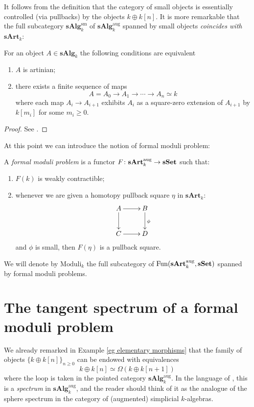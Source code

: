 \begin{refsection}
It follows from the definition that the category of small objects is essentially controlled (via pullbacks) by the objects $k \oplus k[n]$. It is more remarkable that the full subcategory $\mathbf{sAlg}_k^{\mathrm{sm}}$ of $\mathbf{sAlg}_k^{\mathrm{aug}}$ spanned by small objects \emph{coincides with $\mathbf{sArt}_k$}:

\begin{prop} \label{prop characterizing artinians}
For an object $A \in \mathbf{sAlg}_k$ the following conditions are equivalent
\begin{enumerate}
\item $A$ is artinian;
\item there exists a finite sequence of maps
\[
A = A_0 \to A_1 \to \cdots \to A_n \simeq k
\]
where each map $A_i \to A_{i+1}$ exhibits $A_i$ as a square-zero extension of $A_{i+1}$ by $k[m_i]$ for some $m_i \ge 0$.
\end{enumerate}
\end{prop}

\begin{proof}
See \cite[Proposition 1.1.11]{dagx}.
\end{proof}

At this point we can introduce the notion of formal moduli problem:

\begin{defin}
A \emph{formal moduli problem} is a functor $F \colon \mathbf{sArt}_k^{\mathrm{aug}} \to \mathbf{sSet}$ such that:
\begin{enumerate}
\item $F(k)$ is weakly contractible;
\item whenever we are given a homotopy pullback square $\eta$ in $\mathbf{sArt}_k$:
\[
\xymatrix{
A \ar[r] \ar[d] & B \ar[d]^\phi \\ C \ar[r] & D
}
\]
and $\phi$ is small, then $F(\eta)$ is a pullback square.
\end{enumerate}
We will denote by $\mathrm{Moduli}_k$ the full subcategory of $\mathrm{Fun}(\mathbf{sArt}_k^{\mathrm{aug}}, \mathbf{sSet})$ spanned by formal moduli problems.
\end{defin}

\section{The tangent spectrum of a formal moduli problem}

We already remarked in Example \ref{eg elementary morphisms} that the family of objects $\{k \oplus k[n]\}_{n \ge 0}$ can be endowed with equivalences
\[
k \oplus k[n] \simeq \Omega( k \oplus k[n+1] )
\]
where the loop is taken in the pointed category $\mathbf{sAlg}_k^{\mathrm{aug}}$. In the language of \cite{ha}, this is a \emph{spectrum} in $\mathbf{sAlg}_k^{\mathrm{aug}}$, and the reader should think of it as the analogue of the sphere spectrum in the category of (augmented) simplicial $k$-algebras.


\end{refsection}
